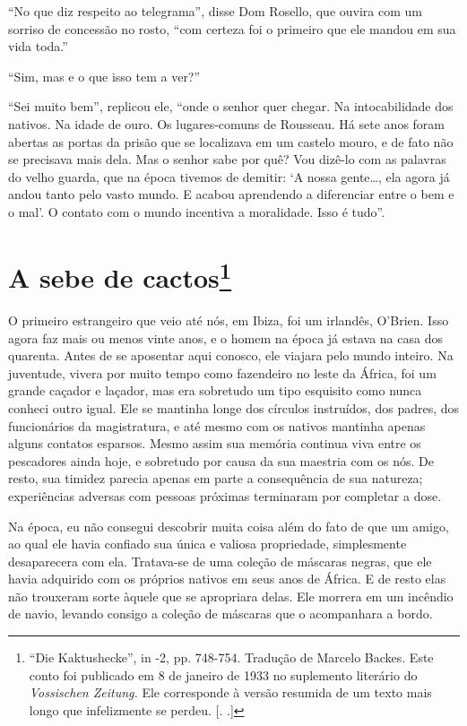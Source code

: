 ``No que diz respeito ao telegrama'', disse Dom Rosello, que ouvira com
um sorriso de concessão no rosto, ``com certeza foi o primeiro que ele
mandou em sua vida toda.''

``Sim, mas e o que isso tem a ver?''

``Sei muito bem'', replicou ele, ``onde o senhor quer chegar. Na
intocabilidade dos nativos. Na idade de ouro. Os lugares-comuns de
Rousseau. Há sete anos foram abertas as portas da prisão que se
localizava em um castelo mouro, e de fato não se precisava mais dela.
Mas o senhor sabe por quê? Vou dizê-lo com as palavras do velho guarda,
que na época tivemos de demitir: `A nossa gente\ldots{}, ela agora já
andou tanto pelo vasto mundo. E acabou aprendendo a diferenciar entre o
bem e o mal'. O contato com o mundo incentiva a moralidade. Isso é
tudo''.

\chapter{A sebe de cactos\footnote[*]{``Die Kaktushecke'', in  -2, pp. 748-754.
  Tradução de Marcelo Backes. Este conto foi publicado em 8 de janeiro
  de 1933 no suplemento literário do \emph{Vossischen Zeitung.} Ele
  corresponde à versão resumida de um texto mais longo que infelizmente
  se perdeu. [. .]} }

O primeiro estrangeiro que veio até nós, em Ibiza, foi um irlandês,
O'Brien. Isso agora faz mais ou menos vinte anos, e o homem na época já
estava na casa dos quarenta. Antes de se aposentar aqui conosco, ele
viajara pelo mundo inteiro. Na juventude, vivera por muito tempo como
fazendeiro no leste da África, foi um grande caçador e laçador, mas era
sobretudo um tipo esquisito como nunca conheci outro igual. Ele se
mantinha longe dos círculos instruídos, dos padres, dos funcionários da
magistratura, e até mesmo com os nativos mantinha apenas alguns contatos
esparsos. Mesmo assim sua memória continua viva entre os pescadores
ainda hoje, e sobretudo por causa da sua maestria com os nós. De resto,
sua timidez parecia apenas em parte a consequência de sua natureza;
experiências adversas com pessoas próximas terminaram por completar a
dose.

Na época, eu não consegui descobrir muita coisa além do fato de que um
amigo, ao qual ele havia confiado sua única e valiosa propriedade,
simplesmente desaparecera com ela. Tratava-se de uma coleção de máscaras
negras, que ele havia adquirido com os próprios nativos em seus anos de
África. E de resto elas não trouxeram sorte àquele que se apropriara
delas. Ele morrera em um incêndio de navio, levando consigo a coleção de
máscaras que o acompanhara a bordo.

